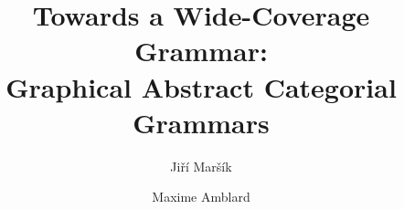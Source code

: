 \documentclass{article}
\begin{document}
\title{Towards a Wide-Coverage Grammar: \\ Graphical Abstract Categorial Grammars}
\author{Jiří Maršík \and Maxime Amblard}
\maketitle







\end{document}
